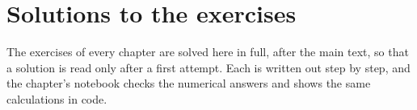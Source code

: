 \chapter{Solutions to the exercises}
\label{ch:solutions}

The exercises of every chapter are solved here in full, after the main
text, so that a solution is read only after a first attempt. Each is
written out step by step, and the chapter's notebook checks the
numerical answers and shows the same calculations in code.



















